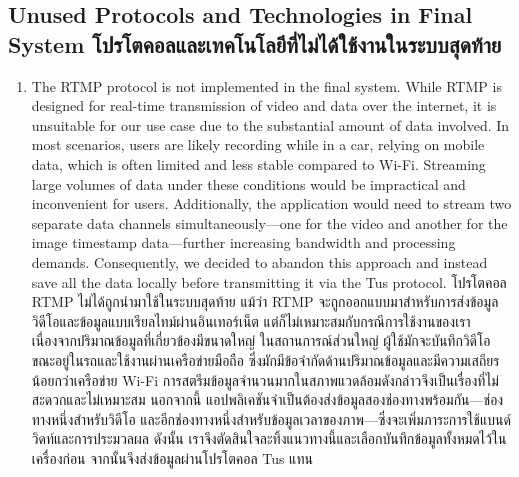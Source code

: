\subsection{\ifenglish Unused Protocols and Technologies in Final System \else โปรโตคอลและเทคโนโลยีที่ไม่ได้ใช้งานในระบบสุดท้าย \fi}

\begin{enumerate}
    \item \ifenglish The RTMP protocol is not implemented in the final system. While RTMP is designed for real-time transmission of video and data over the internet, it is unsuitable for our use case due to the substantial amount of data involved. In most scenarios, users are likely recording while in a car, relying on mobile data, which is often limited and less stable compared to Wi-Fi. Streaming large volumes of data under these conditions would be impractical and inconvenient for users. Additionally, the application would need to stream two separate data channels simultaneously—one for the video and another for the image timestamp data—further increasing bandwidth and processing demands. Consequently, we decided to abandon this approach and instead save all the data locally before transmitting it via the Tus protocol.
    \else โปรโตคอล RTMP ไม่ได้ถูกนำมาใช้ในระบบสุดท้าย แม้ว่า RTMP จะถูกออกแบบมาสำหรับการส่งข้อมูลวิดีโอและข้อมูลแบบเรียลไทม์ผ่านอินเทอร์เน็ต แต่ก็ไม่เหมาะสมกับกรณีการใช้งานของเรา เนื่องจากปริมาณข้อมูลที่เกี่ยวข้องมีขนาดใหญ่ ในสถานการณ์ส่วนใหญ่ ผู้ใช้มักจะบันทึกวิดีโอขณะอยู่ในรถและใช้งานผ่านเครือข่ายมือถือ ซึ่งมักมีข้อจำกัดด้านปริมาณข้อมูลและมีความเสถียรน้อยกว่าเครือข่าย Wi-Fi การสตรีมข้อมูลจำนวนมากในสภาพแวดล้อมดังกล่าวจึงเป็นเรื่องที่ไม่สะดวกและไม่เหมาะสม นอกจากนี้ แอปพลิเคชันจำเป็นต้องส่งข้อมูลสองช่องทางพร้อมกัน—ช่องทางหนึ่งสำหรับวิดีโอ และอีกช่องทางหนึ่งสำหรับข้อมูลเวลาของภาพ—ซึ่งจะเพิ่มภาระการใช้แบนด์วิดท์และการประมวลผล ดังนั้น เราจึงตัดสินใจละทิ้งแนวทางนี้และเลือกบันทึกข้อมูลทั้งหมดไว้ในเครื่องก่อน จากนั้นจึงส่งข้อมูลผ่านโปรโตคอล Tus แทน
    \fi
\end{enumerate}
